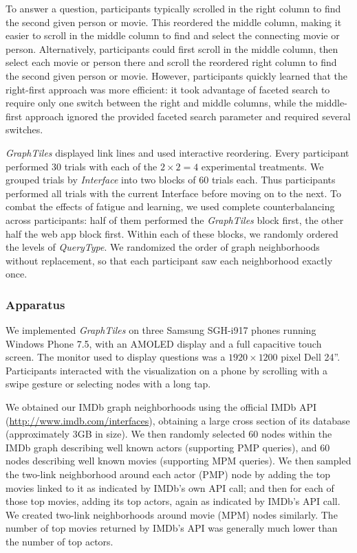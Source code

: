 To answer a question, participants typically scrolled in the right column to find the second given person or movie. This reordered the middle column, making it easier to scroll in the middle column to find and select the connecting movie or person. Alternatively, participants could first scroll in the middle column, then select each movie or person there and scroll the reordered right column to find the second given person or movie. However, participants quickly learned that the right-first approach was more efficient: it took advantage of faceted search to require only one switch between the right and middle columns, while the middle-first approach ignored the provided faceted search parameter and required several switches.

\textit{GraphTiles} displayed link lines and used interactive reordering. Every participant performed $30$ trials with each of the $2 \times 2 = 4$ experimental treatments. We grouped trials by \textit{Interface} into two blocks of $60$ trials each. Thus participants performed all trials with the current Interface before moving on to the next. To combat the effects of fatigue and learning, we used complete counterbalancing across participants: half of them performed the \textit{GraphTiles} block first, the other half the web app block first. Within each of these blocks, we randomly ordered the levels of \textit{QueryType}. We randomized the order of graph neighborhoods without replacement, so that each participant saw each neighborhood exactly once.

\subsubsection{Apparatus}

We implemented \textit{GraphTiles} on three Samsung SGH-i917 phones running Windows Phone 7.5, with an AMOLED display and a full capacitive touch screen. The monitor used to display questions was a $1920 \times 1200$ pixel Dell 24''. Participants interacted with the visualization on a phone by scrolling with a swipe gesture or selecting nodes with a long tap.

We obtained our IMDb graph neighborhoods using the official IMDb API (\url{http://www.imdb.com/interfaces}), obtaining a large cross section of its database (approximately 3GB in size). We then randomly selected 60 nodes within the IMDb graph describing well known actors (supporting PMP queries), and 60 nodes describing well known movies (supporting MPM queries). We then sampled the two-link neighborhood around each actor (PMP) node by adding the top movies linked to it as indicated by IMDb's own API call; and then for each of those top movies, adding its top actors, again as indicated by IMDb's API call. We created two-link neighborhoods around movie (MPM) nodes similarly. The number of top movies returned by IMDb's API was generally much lower than the number of top actors. 


